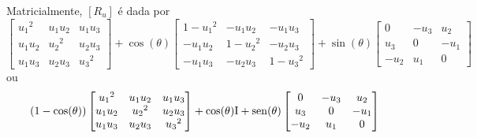 Matricialmente, $[R_u]$ é dada por
	\begin{equation*}
	\begin{bmatrix}
			{u_1}^2 & u_1u_2 & u_1u_3 \\ 
			u_1u_2 & {u_2}^2 & u_2u_3 \\ 
			u_1u_3 & u_2u_3 & {u_3}^2
	\end{bmatrix}
	+\cos(\theta)
	\begin{bmatrix}
		1-{u_1}^2 & -u_1u_2 & -u_1u_3 \\ 
		-u_1u_2 & 1-{u_2}^2 & -u_2u_3 \\ 
		-u_1u_3 & -u_2u_3 & 1-{u_3}^2
	\end{bmatrix}
	+ \sin(\theta)
	\begin{bmatrix}
			0 & -u_3 & u_2 \\ 
			u_3 & 0 & -u_1 \\ 
			-u_2 & u_1 & 0
	\end{bmatrix}
	\end{equation*}
ou
	\begin{equation*}
	(1-\cos(\theta))
	\begin{bmatrix}
			{u_1}^2 & u_1u_2 & u_1u_3 \\ 
			u_1u_2 & {u_2}^2 & u_2u_3 \\ 
			u_1u_3 & u_2u_3 & {u_3}^2
	\end{bmatrix}
	+
	\cos(\theta)\mathrm{I} + \operatorname{sen}(\theta)
	\begin{bmatrix}
			0 & -u_3 & u_2 \\ 
			u_3 & 0 & -u_1 \\ 
			-u_2 & u_1 & 0
	\end{bmatrix}
	\end{equation*}








